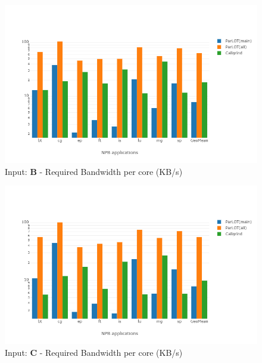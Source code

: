 

\begin{figure}[!t]
\centering
\includegraphics[width=6in]{figs.comet/comet_chartAvg_bw_B_p3_5.png}
\caption{ Input: \textbf{B} - Required Bandwidth per core (KB/s)
}
\label{comet_chartAvg_bw_B_p3_5}
\end{figure}

\begin{figure}[!t]
\centering
\includegraphics[width=6in]{figs.comet/comet_chartAvg_bw_C_p3_5.png}
\caption{ Input: \textbf{C}  - Required Bandwidth per core (KB/s)
}
\label{comet_chartAvg_bw_C_p3_5}
\end{figure}








